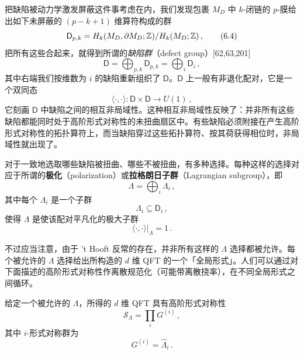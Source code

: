 把缺陷被动力学激发屏蔽这件事考虑在内，我们发现包裹 $M_D$ 中 $k$-闭链的 $p$-膜给出如下未屏蔽的 $(p-k+1)$ 维算符构成的群
\begin{equation}
  \mathsf{D}_{p,k} = H_k(M_D,\partial M_D;\mathbb{Z})/H_k(M_D;\mathbb{Z})\,, \tag{6.4}
\end{equation}
把所有这些合起来，就得到所谓的\emph{缺陷群}（defect group）[62,63,201]
\begin{equation}
  \mathsf{D} = \bigoplus_{p,k} \mathsf{D}_{p,k} = \bigoplus_i \mathsf{D}_i\,, \tag{6.5}
\end{equation}
其中右端我们按维数为 $i$ 的缺陷重新组织了 $\mathsf{D}$。$\mathsf{D}$ 上一般有非退化配对，它是一个双同态
\begin{equation}
  \langle \cdot , \cdot \rangle : \mathsf{D} \times \mathsf{D} \to U(1)\,, \tag{6.6}
\end{equation}
它刻画 $\mathsf{D}$ 中缺陷之间的相互非局域性。这种相互非局域性反映了：并非所有这些缺陷都能同时处于高阶形式对称性的未扭曲扇区中。有些缺陷必须附接在产生高阶形式对称性的拓扑算符上，而当缺陷穿过这些拓扑算符、按其荷获得相位时，非局域性就出现了。

对于一致地选取哪些缺陷被扭曲、哪些不被扭曲，有多种选择。每种这样的选择对应于所谓的\textbf{极化}（polarization）或\textbf{拉格朗日子群}（Lagrangian subgroup），即
\begin{equation}
  \Lambda = \bigoplus_i \Lambda_i\,, \tag{6.7}
\end{equation}
其中每个 $\Lambda_i$ 是一个子群
\begin{equation}
  \Lambda_i \subseteq \mathsf{D}_i\,, \tag{6.8}
\end{equation}
使得 $\Lambda$ 是使该配对平凡化的极大子群
\begin{equation}
  \langle \cdot , \cdot \rangle|_\Lambda = 1\,. \tag{6.9}
\end{equation}


不过应当注意，由于 't Hooft 反常的存在，并非所有这样的 $\Lambda$ 选择都被允许。每个被允许的 $\Lambda$ 选择给出所构造的 $d$ 维 QFT 的一个「全局形式」。人们可以通过对下面描述的高阶形式对称性作离散规范化（可能带离散挠率），在不同全局形式之间循环。

给定一个被允许的 $\Lambda$，所得的 $d$ 维 QFT 具有高阶形式对称性
\begin{equation}
  \mathcal{S}_\Lambda = \prod_i G^{(i)}\,, \tag{6.10}
\end{equation}
其中 $i$-形式对称群为
\begin{equation}
  G^{(i)} = \widehat{\Lambda}_i\,. \tag{6.11}
\end{equation}

